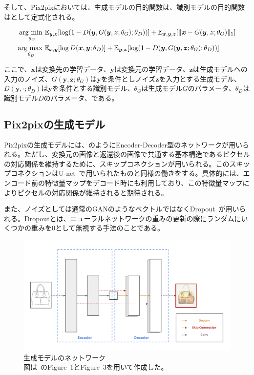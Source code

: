 そして、Pix2pixにおいては、生成モデルの目的関数は、識別モデルの目的関数はとして定式化される。

\begin{align}
    \label{eq:pix2pix_G}
    \mathop{\mathrm{arg~min~}}\limits _{\theta_G}& \mathbb{E}_{\boldsymbol{y}, \boldsymbol{z}}[\log (1-D(\boldsymbol{y}, G(\boldsymbol{y}, \boldsymbol{z}; \theta_G); \theta_D))]+\mathbb{E}_{\boldsymbol{x}, \boldsymbol{y}, \boldsymbol{z}}[\|\boldsymbol{x}-G(\boldsymbol{y}, \boldsymbol{z}; \theta_G)\|_{1}]\\
    \label{eq:pix2pix_D}
    \mathop{\mathrm{arg~max~}}\limits _{\theta_D}& \mathbb{E}_{\boldsymbol{x}, \boldsymbol{y}}[\log D(\boldsymbol{x}, \boldsymbol{y}; \theta_D)]+\mathbb{E}_{\boldsymbol{y}, \boldsymbol{z}}[\log (1-D(\boldsymbol{y}, G(\boldsymbol{y}, \boldsymbol{z}; \theta_G); \theta_D))]
\end{align}

ここで、$\boldsymbol{x}$は変換先の学習データ、$\boldsymbol{y}$は変換元の学習データ、$\boldsymbol{z}$は生成モデルへの入力のノイズ、$G(\boldsymbol{y},\boldsymbol{z};\theta_G)$は$\boldsymbol{y}$を条件としノイズ$\boldsymbol{z}$を入力とする生成モデル、$D(\boldsymbol{y},\cdot;\theta_D)$は$\boldsymbol{y}$を条件とする識別モデル、$\theta_G$は生成モデル$G$のパラメータ、$\theta_D$は識別モデル$D$のパラメータ、である。

\subsection{Pix2pixの生成モデル}

Pix2pixの生成モデルには、のようにEncoder-Decoder型のネットワークが用いられる。ただし、変換元の画像と返還後の画像で共通する基本構造であるピクセルの対応関係を維持するために、スキップコネクションが用いられる。このスキップコネクションはU-net~\cite{u-net}で用いられたものと同様の働きをする。具体的には、エンコード前の特徴量マップをデコード時にも利用しており、この特徴量マップによりピクセルの対応関係が維持されると期待される。

また、ノイズとしては通常のGANのようなベクトルではなくDropout~\cite{Dropout}が用いられる。Dropoutとは、ニューラルネットワークの重みの更新の際にランダムにいくつかの重みを0として無視する手法のことである。

\clearpage

\begin{figure}[t]
\centering
\includegraphics[width=0.8\hsize]{figure/u-net.png}
\caption[Pix2pixの生成モデル]{生成モデルのネットワーク\\
図は~\cite{pix2pix}のFigure~1とFigure~3を用いて作成した。}
\label{fig:u-net}
\end{figure}

